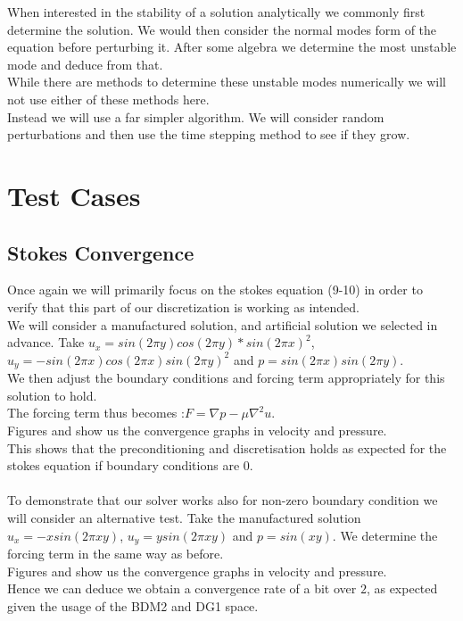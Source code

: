 \documentclass[11pt,twoside,a4paper]{article}
\begin{document}
When interested in the stability of a solution analytically we commonly first determine the solution. We would then consider the normal modes form of the equation before perturbing it. After some algebra we determine the most unstable mode and deduce from that.\\
While there are methods to determine these unstable modes numerically we will not use either of these methods here.\\
Instead we will use a far simpler algorithm.
We will consider random perturbations and then use the time stepping method to see if they grow.

\section{Test Cases}
\subsection{Stokes Convergence}

Once again we will primarily focus on the stokes equation (9-10) in order to verify that this part of our discretization is working as intended.\\
We will consider a manufactured solution, and artificial solution we selected in advance. Take $u_x = sin(2 \pi y) cos(2 \pi y)*sin(2 \pi x)^2$, $u_y= -sin(2 \pi x) cos(2 \pi x) sin(2 \pi y)^2$ and $p = sin(2 \pi x) sin(2 \pi y)$.\\
We then adjust the boundary conditions and forcing term appropriately for this solution to hold.\\
 The forcing term thus becomes :$F = \nabla p - \mu \nabla^2 u$.\\
Figures and show us the convergence graphs in velocity and pressure.\\
This shows that the preconditioning and discretisation holds as expected for the stokes equation if boundary conditions are $0$.
\\
\\
To demonstrate that our solver works also for non-zero boundary condition we will consider an alternative test.
Take the manufactured solution $u_x = -x sin(2 \pi x y)$, $u_y = y sin(2 \pi x y)$ and $p = sin(x y)$.
We determine the forcing term in the same way as before.\\
Figures and show us the convergence graphs in velocity and pressure.\\
Hence we can deduce we obtain a convergence rate of a bit over $2$, as expected given the usage of the BDM2 and DG1 space.
\end{document}
